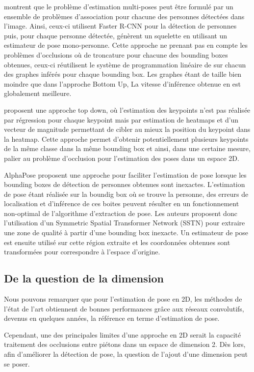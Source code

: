 \cite{2016arXiv160808526I} montrent que le problème d'estimation multi-poses peut être formulé par un ensemble de problèmes d'association pour chacune des personnes détectées dans l'image. Ainsi, ceux-ci utilisent Faster R-CNN pour la détection de personnes puis, pour chaque personne détectée, génèrent un squelette en utilisant un estimateur de pose mono-personne. Cette approche ne prenant pas en compte les problèmes d'occlusions où de troncature pour chacune des bounding boxes obtenues, ceux-ci réutilisent le système de programmation linéaire de \cite{2015arXiv151106645P} sur chacun des graphes inférés pour chaque bounding box. Les graphes étant de taille bien moindre que dans l'approche Bottom Up, La vitesse d'inférence obtenue en est globalement meilleure.

\cite{2017arXiv170101779P} proposent une approche top down, où l'estimation des keypoints n'est pas réalisée par régression pour chaque keypoint mais par estimation de heatmaps et d'un vecteur de magnitude permettant de cibler au mieux la position du keypoint dans la heatmap. Cette approche permet d'obtenir potentiellement plusieurs keypoints de la même classe dans la même bounding box et ainsi, dans une certaine mesure, palier au problème d'occlusion pour l'estimation des poses dans un espace 2D. 

AlphaPose \cite{fang2017rmpe} proposent une approche pour faciliter l'estimation de pose lorsque les bounding boxes de détection de personnes obtenues sont inexactes. L'estimation de pose étant réalisée sur la boundig box où se trouve la personne, des erreurs de localisation et d'inférence de ces boites peuvent résulter en un fonctionnement non-optimal de l'algorithme d'extraction de pose. Les auteurs proposent donc l'utilisation d'un Symmetric Spatial Transformer Network (SSTN) pour extraire une zone de qualité à partir d'une bounding box inexacte. Un estimateur de pose est ensuite utilisé sur cette région extraite et les coordonnées obtenues sont transformées pour correspondre à l'espace d'origine.


\subsection{De la question de la dimension}
Nous pouvons remarquer que pour l'estimation de pose en 2D, les méthodes de l'état de l'art obtiennent de bonnes performances grâce aux réseaux convolutifs, devenus en quelques années, la référence en terme d'estimation de pose.

Cependant, une des principales limites d'une approche en 2D serait la capacité traitement des occlusions entre piétons dans un espace de dimension 2. Dès lors, afin d'améliorer la détection de pose, la question de l'ajout d'une dimension peut se poser.

